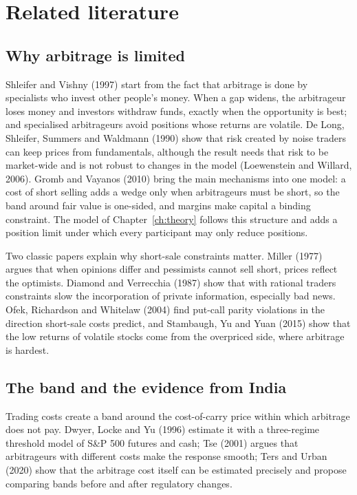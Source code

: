 \chapter{Related literature}\label{ch:lit}

\section{Why arbitrage is limited}
Shleifer and Vishny (1997) start from the fact that arbitrage is done by specialists who invest other people's money.
When a gap widens, the arbitrageur loses money and investors withdraw funds, exactly when the opportunity is best; and
specialised arbitrageurs avoid positions whose returns are volatile. De Long, Shleifer, Summers and Waldmann (1990) show
that risk created by noise traders can keep prices from fundamentals, although the result needs that risk to be
market-wide and is not robust to changes in the model (Loewenstein and Willard, 2006). Gromb and Vayanos (2010) bring the
main mechanisms into one model: a cost of short selling adds a wedge only when arbitrageurs must be short, so the band
around fair value is one-sided, and margins make capital a binding constraint. The model of Chapter~\ref{ch:theory}
follows this structure and adds a position limit under which every participant may only reduce positions.

Two classic papers explain why short-sale constraints matter. Miller (1977) argues that when opinions differ and
pessimists cannot sell short, prices reflect the optimists. Diamond and Verrecchia (1987) show that with rational
traders constraints slow the incorporation of private information, especially bad news. Ofek, Richardson and Whitelaw
(2004) find put-call parity violations in the direction short-sale costs predict, and Stambaugh, Yu and Yuan (2015) show
that the low returns of volatile stocks come from the overpriced side, where arbitrage is hardest.

\section{The band and the evidence from India}
Trading costs create a band around the cost-of-carry price within which arbitrage does not pay. Dwyer, Locke and Yu
(1996) estimate it with a three-regime threshold model of S\&P 500 futures and cash; Tse (2001) argues that arbitrageurs
with different costs make the response smooth; Ters and Urban (2020) show that the arbitrage cost itself can be estimated
precisely and propose comparing bands before and after regulatory changes.

